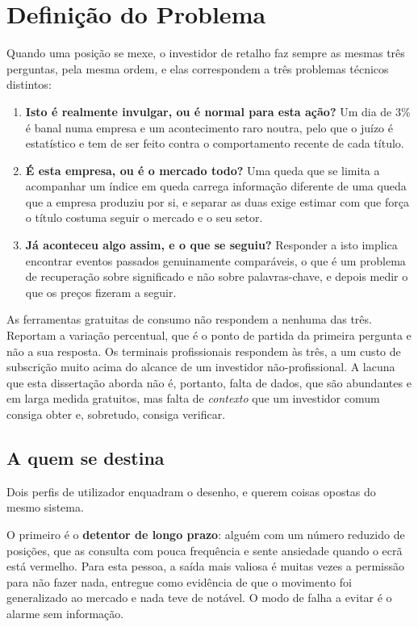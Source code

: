 \section{Definição do Problema}
\label{sec:intro_problem}

Quando uma posição se mexe, o investidor de retalho faz sempre as mesmas três perguntas, pela mesma
ordem, e elas correspondem a três problemas técnicos distintos:

\begin{enumerate}
  \item \textbf{Isto é realmente invulgar, ou é normal para esta ação?} Um dia de 3\% é banal numa
        empresa e um acontecimento raro noutra, pelo que o juízo é estatístico e tem de ser feito
        contra o comportamento recente de cada título.
  \item \textbf{É esta empresa, ou é o mercado todo?} Uma queda que se limita a acompanhar um índice
        em queda carrega informação diferente de uma queda que a empresa produziu por si, e separar
        as duas exige estimar com que força o título costuma seguir o mercado e o seu setor.
  \item \textbf{Já aconteceu algo assim, e o que se seguiu?} Responder a isto implica encontrar
        eventos passados genuinamente comparáveis, o que é um problema de recuperação sobre
        significado e não sobre palavras-chave, e depois medir o que os preços fizeram a seguir.
\end{enumerate}

As ferramentas gratuitas de consumo não respondem a nenhuma das três. Reportam a variação
percentual, que é o ponto de partida da primeira pergunta e não a sua resposta. Os terminais
profissionais respondem às três, a um custo de subscrição muito acima do alcance de um investidor
não-profissional. A lacuna que esta dissertação aborda não é, portanto, falta de dados, que são
abundantes e em larga medida gratuitos, mas falta de \emph{contexto} que um investidor comum
consiga obter e, sobretudo, consiga verificar.

\subsection*{A quem se destina}

Dois perfis de utilizador enquadram o desenho, e querem coisas opostas do mesmo sistema.

O primeiro é o \textbf{detentor de longo prazo}: alguém com um número reduzido de posições, que as
consulta com pouca frequência e sente ansiedade quando o ecrã está vermelho. Para esta pessoa, a
saída mais valiosa é muitas vezes a permissão para não fazer nada, entregue como evidência de que o
movimento foi generalizado ao mercado e nada teve de notável. O modo de falha a evitar é o alarme
sem informação.

